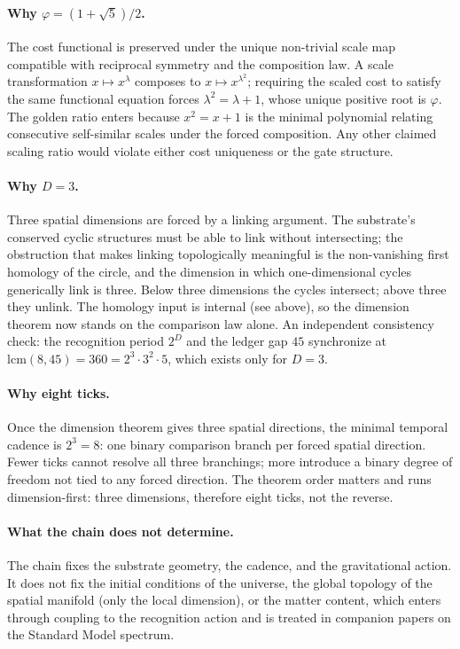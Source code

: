 \documentclass[11pt,letterpaper]{article}
\theoremstyle{definition}
\newcommand{\phiG}{\varphi}
\begin{document}
\paragraph{Why $\phiG=(1+\sqrt5)/2$.}
The cost functional is preserved under the unique non-trivial scale
map compatible with reciprocal symmetry and the composition law.  A
scale transformation $x\mapsto x^\lambda$ composes to
$x\mapsto x^{\lambda^2}$; requiring the scaled cost to satisfy the same
functional equation forces $\lambda^2=\lambda+1$, whose unique positive
root is $\phiG$.  The golden ratio enters because $x^2=x+1$ is the
minimal polynomial relating consecutive self-similar scales under the
forced composition.  Any other claimed scaling ratio would violate
either cost uniqueness or the gate structure.

\paragraph{Why $D=3$.}
Three spatial dimensions are forced by a linking argument.  The
substrate's conserved cyclic structures must be able to link without
intersecting; the obstruction that makes linking topologically
meaningful is the non-vanishing first homology of the circle, and the
dimension in which one-dimensional cycles generically link is three.
Below three dimensions the cycles intersect; above three they unlink.
The homology input is internal (see above), so the dimension theorem
now stands on the comparison law alone.  An independent consistency
check: the recognition period $2^D$ and the ledger gap $45$
synchronize at $\mathrm{lcm}(8,45)=360=2^3\cdot 3^2\cdot 5$, which
exists only for $D=3$.

\paragraph{Why eight ticks.}
Once the dimension theorem gives three spatial directions, the minimal
temporal cadence is $2^3=8$: one binary comparison branch per forced
spatial direction.  Fewer ticks cannot resolve all three branchings;
more introduce a binary degree of freedom not tied to any forced
direction.  The theorem order matters and runs dimension-first: three
dimensions, therefore eight ticks, not the reverse.

\paragraph{What the chain does not determine.}
The chain fixes the substrate geometry, the cadence, and the
gravitational action.  It does not fix the initial conditions of the
universe, the global topology of the spatial manifold (only the local
dimension), or the matter content, which enters through coupling to
the recognition action and is treated in companion papers on the
Standard Model spectrum.
\end{document}
